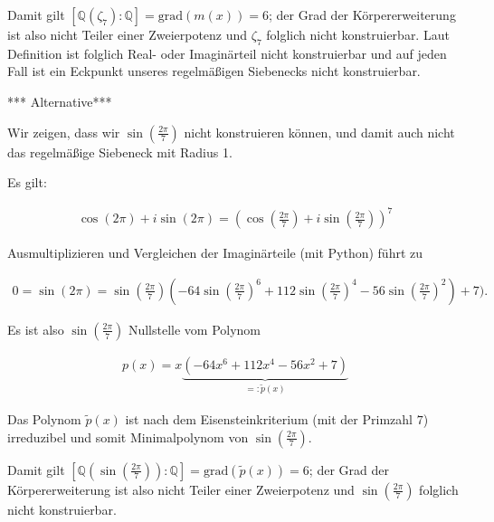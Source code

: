 \begin{solution}
  Damit gilt $[\mathbb{Q}(\zeta_7):\mathbb{Q}] = \mathrm{grad}(m(x)) = 6$; der Grad der Körpererweiterung ist also nicht Teiler einer Zweierpotenz und $\zeta_7$ folglich nicht konstruierbar. Laut Definition ist folglich Real- oder Imaginärteil nicht konstruierbar und auf jeden Fall
  ist ein Eckpunkt unseres regelmäßigen Siebenecks nicht konstruierbar.


  *** Alternative***

  Wir zeigen, dass wir $\sin(\frac{2 \pi }{7})$ nicht konstruieren können,
  und damit auch nicht das regelmäßige Siebeneck mit Radius 1.

  Es gilt:

  \begin{align*}
    \cos(2 \pi) + i \sin(2 \pi) = (\cos(\frac{2 \pi }{7}) + i \sin(\frac{2 \pi }{7}))^{7}
  \end{align*}

  Ausmultiplizieren und Vergleichen der Imaginärteile (mit Python) führt zu

  \begin{align*}
    0 = \sin(2 \pi) = \sin(\frac{2 \pi }{7}) (-64 \sin(\frac{2 \pi }{7})^{6} + 112 \sin(\frac{2 \pi }{7})^4 - 56 \sin(\frac{2 \pi }{7})^2) + 7).
  \end{align*}

  Es ist also $\sin(\frac{2 \pi }{7})$ Nullstelle vom Polynom

  \begin{align*}
    p(x) = x\underbrace{(-64x^6 + 112x^4 - 56x^2 + 7)}_{=:\tilde{p}(x)}
  \end{align*}

  Das Polynom $\tilde{p}(x)$ ist nach dem Eisensteinkriterium (mit der Primzahl $7$) irreduzibel und somit Minimalpolynom von $\sin(\frac{2 \pi }{7})$.

  Damit gilt $[\mathbb{Q}(\sin(\frac{2 \pi }{7})):\mathbb{Q}] = \mathrm{grad}(\tilde{p}(x)) = 6$; der Grad der Körpererweiterung ist also nicht Teiler einer Zweierpotenz und $\sin(\frac{2 \pi }{7})$ folglich nicht konstruierbar.

\end{solution}
